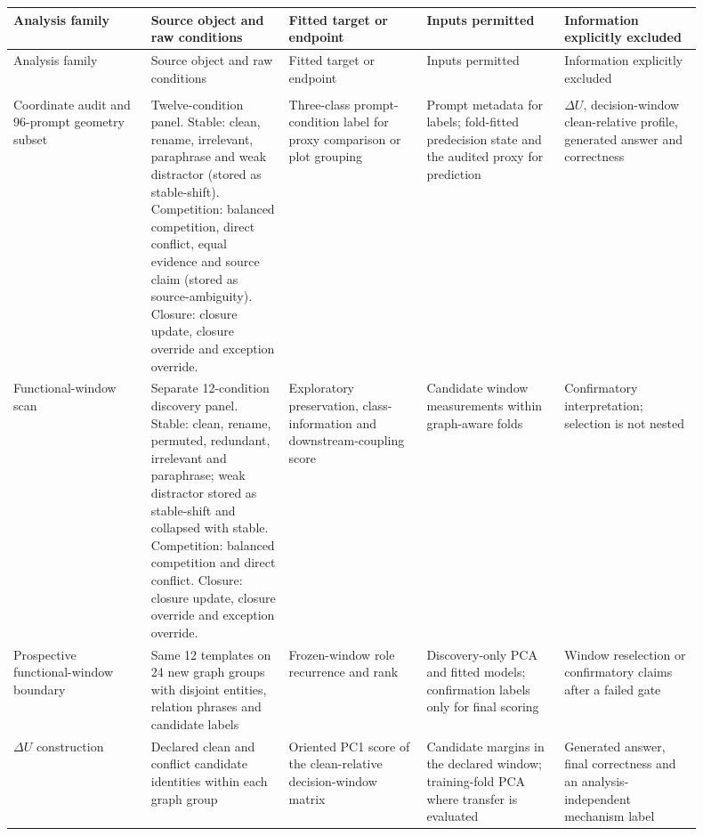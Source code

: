 \documentclass[10pt]{article}
\begin{document}
\begin{landscape}
\fontsize{6}{6.6}\selectfont
\setlength{\tabcolsep}{2.5pt}
\renewcommand{\arraystretch}{1.08}
\begin{longtable}{@{}>{\RaggedRight\arraybackslash}p{0.180\linewidth}>{\RaggedRight\arraybackslash}p{0.180\linewidth}>{\RaggedRight\arraybackslash}p{0.180\linewidth}>{\RaggedRight\arraybackslash}p{0.180\linewidth}>{\RaggedRight\arraybackslash}p{0.180\linewidth}@{}}
\toprule
Analysis family & Source object and raw conditions & Fitted target or endpoint & Inputs permitted & Information explicitly excluded \\
\midrule
\endfirsthead
\toprule
Analysis family & Source object and raw conditions & Fitted target or endpoint & Inputs permitted & Information explicitly excluded \\
\midrule
\endhead
\midrule
\multicolumn{5}{r}{\footnotesize Continued on next page} \\
\endfoot
\bottomrule
\endlastfoot
Coordinate audit and 96-prompt geometry subset & Twelve-condition panel. Stable: clean, rename, irrelevant, paraphrase and weak distractor (stored as stable-shift). Competition: balanced competition, direct conflict, equal evidence and source claim (stored as source-ambiguity). Closure: closure update, closure override and exception override. & Three-class prompt-condition label for proxy comparison or plot grouping & Prompt metadata for labels; fold-fitted predecision state and the audited proxy for prediction & \(\Delta U\), decision-window clean-relative profile, generated answer and correctness \\
Functional-window scan & Separate 12-condition discovery panel. Stable: clean, rename, permuted, redundant, irrelevant and paraphrase; weak distractor stored as stable-shift and collapsed with stable. Competition: balanced competition and direct conflict. Closure: closure update, closure override and exception override. & Exploratory preservation, class-information and downstream-coupling score & Candidate window measurements within graph-aware folds & Confirmatory interpretation; selection is not nested \\
Prospective functional-window boundary & Same 12 templates on 24 new graph groups with disjoint entities, relation phrases and candidate labels & Frozen-window role recurrence and rank & Discovery-only PCA and fitted models; confirmation labels only for final scoring & Window reselection or confirmatory claims after a failed gate \\
\(\Delta U\) construction & Declared clean and conflict candidate identities within each graph group & Oriented PC1 score of the clean-relative decision-window matrix & Candidate margins in the declared window; training-fold PCA where transfer is evaluated & Generated answer, final correctness and an analysis-independent mechanism label \\

\end{longtable}
\end{landscape}
\end{document}
